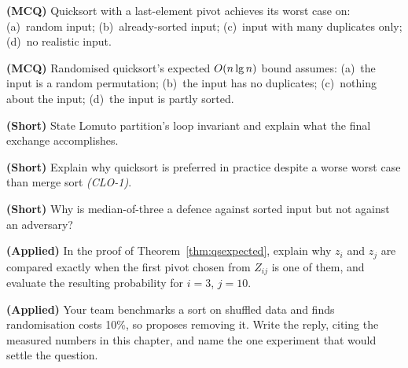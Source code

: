 \begin{reviewq}
  \item \textbf{(MCQ)} Quicksort with a last-element pivot achieves its worst
        case on: (a)~random input; (b)~already-sorted input; (c)~input with
        many duplicates only; (d)~no realistic input.
  \item \textbf{(MCQ)} Randomised quicksort's expected $O(n\operatorname{lg} n)$ bound
        assumes: (a)~the input is a random permutation; (b)~the input has no
        duplicates; (c)~nothing about the input; (d)~the input is partly
        sorted.
  \item \textbf{(Short)} State Lomuto partition's loop invariant and explain
        what the final exchange accomplishes.
  \item \textbf{(Short)} Explain why quicksort is preferred in practice despite
        a worse worst case than merge sort \emph{(CLO-1)}.
  \item \textbf{(Short)} Why is median-of-three a defence against sorted input
        but not against an adversary?
  \item \textbf{(Applied)} In the proof of Theorem~\ref{thm:qsexpected}, explain
        why $z_{i}$ and $z_{j}$ are compared exactly when the first pivot
        chosen from $Z_{ij}$ is one of them, and evaluate the resulting
        probability for $i=3$, $j=10$.
  \item \textbf{(Applied)} Your team benchmarks a sort on shuffled data and
        finds randomisation costs 10\%, so proposes removing it. Write the
        reply, citing the measured numbers in this chapter, and name the one
        experiment that would settle the question.
\end{reviewq}
